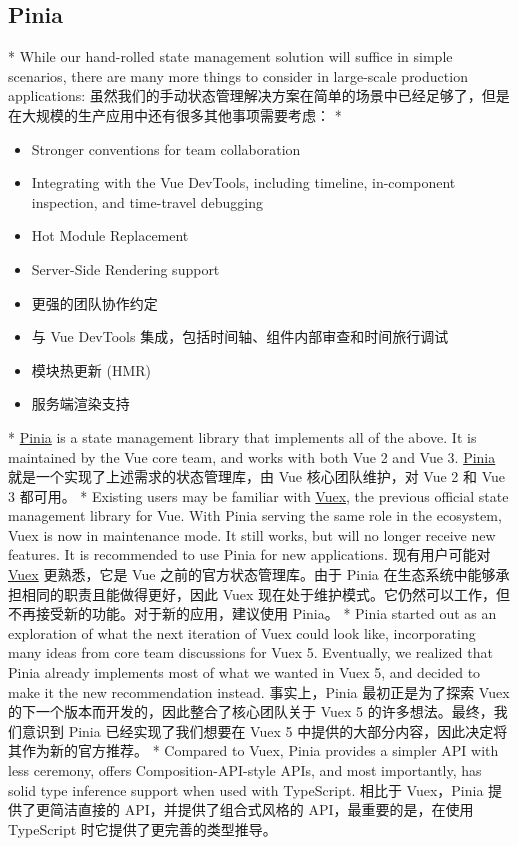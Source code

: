 \begin{paracol}{2}
\subsection{Pinia}
\switchcolumn[0]*%
While our hand-rolled state management solution will suffice in simple
scenarios, there are many more things to consider in large-scale
production applications:
\switchcolumn
虽然我们的手动状态管理解决方案在简单的场景中已经足够了，但是在大规模的生产应用中还有很多其他事项需要考虑：
\switchcolumn[0]*%
\begin{itemize}
\item
  Stronger conventions for team collaboration
\item
  Integrating with the Vue DevTools, including timeline, in-component
  inspection, and time-travel debugging
\item
  Hot Module Replacement
\item
  Server-Side Rendering support
\end{itemize}
\switchcolumn
\begin{itemize}
\item
  更强的团队协作约定
\item
  与 Vue DevTools 集成，包括时间轴、组件内部审查和时间旅行调试
\item
  模块热更新 (HMR)
\item
  服务端渲染支持
\end{itemize}
\switchcolumn[0]*%
\href{https://pinia.vuejs.org/}{Pinia} is a state management library
that implements all of the above. It is maintained by the Vue core team,
and works with both Vue 2 and Vue 3.
\switchcolumn
\href{https://pinia.vuejs.org/zh/}{Pinia}
就是一个实现了上述需求的状态管理库，由 Vue 核心团队维护，对 Vue 2 和 Vue
3 都可用。
\switchcolumn[0]*%
Existing users may be familiar with
\href{https://vuex.vuejs.org/}{Vuex}, the previous official state
management library for Vue. With Pinia serving the same role in the
ecosystem, Vuex is now in maintenance mode. It still works, but will no
longer receive new features. It is recommended to use Pinia for new
applications.
\switchcolumn
现有用户可能对 \href{https://vuex.vuejs.org/zh/}{Vuex} 更熟悉，它是 Vue
之前的官方状态管理库。由于 Pinia
在生态系统中能够承担相同的职责且能做得更好，因此 Vuex
现在处于维护模式。它仍然可以工作，但不再接受新的功能。对于新的应用，建议使用
Pinia。
\switchcolumn[0]*%
Pinia started out as an exploration of what the next iteration of Vuex
could look like, incorporating many ideas from core team discussions for
Vuex 5. Eventually, we realized that Pinia already implements most of
what we wanted in Vuex 5, and decided to make it the new recommendation
instead.
\switchcolumn
事实上，Pinia 最初正是为了探索 Vuex
的下一个版本而开发的，因此整合了核心团队关于 Vuex 5
的许多想法。最终，我们意识到 Pinia 已经实现了我们想要在 Vuex 5
中提供的大部分内容，因此决定将其作为新的官方推荐。
\switchcolumn[0]*%
Compared to Vuex, Pinia provides a simpler API with less ceremony,
offers Composition-API-style APIs, and most importantly, has solid type
inference support when used with TypeScript.
\switchcolumn
相比于 Vuex，Pinia 提供了更简洁直接的 API，并提供了组合式风格的
API，最重要的是，在使用 TypeScript 时它提供了更完善的类型推导。
\end{paracol}

